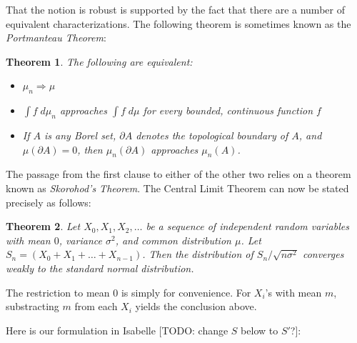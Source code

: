 \documentclass{article}
\newtheorem{theorem}{Theorem}[section]
\begin{document}
That the notion is robust is supported by the fact that there are a number of equivalent characterizations. The following theorem is sometimes known as the \emph{Portmanteau Theorem}:
\begin{theorem}
The following are equivalent:
\begin{itemize}
 \item $\mu_n \Rightarrow \mu$
 \item $\int f \; d\mu_n$ approaches $\int f \; d\mu$ for every bounded, continuous function $f$
 \item If $A$ is any Borel set, $\partial A$ denotes the topological boundary of $A$, and $\mu(\partial A) = 0$, then $\mu_n(\partial A)$ approaches $\mu_n(A)$. 
\end{itemize}
\end{theorem}
The passage from the first clause to either of the other two relies on a theorem known as \emph{Skorohod's Theorem}. The Central Limit Theorem can now be stated precisely as follows:
\begin{theorem}
Let $X_0, X_1, X_2, \ldots$ be a sequence of independent random variables with mean $0$, variance $\sigma^2$, and common distribution $\mu$. Let $S_n = (X_0 + X_1 + \ldots + X_{n-1})$. Then the distribution of $S_n / \sqrt{n \sigma^2}$ converges weakly to the standard normal distribution.
\end{theorem}
The restriction to mean $0$ is simply for convenience. For $X_i$'s with mean $m$, substracting $m$ from each $X_i$ yields the conclusion above.

Here is our formulation in Isabelle [TODO: change $S$ below to $S'$?]:

\bigskip
\end{document}
